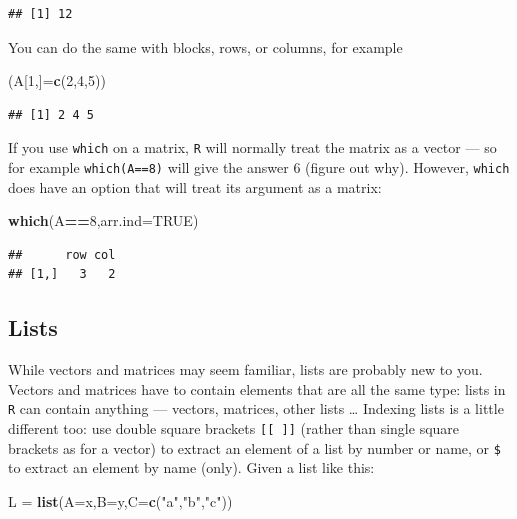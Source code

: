 \documentclass[11pt,]{article}
\newenvironment{Shaded}{\begin{snugshade}}{\end{snugshade}}
\newcommand{\DataTypeTok}[1]{\textcolor[rgb]{0.13,0.29,0.53}{#1}}
\newcommand{\DecValTok}[1]{\textcolor[rgb]{0.00,0.00,0.81}{#1}}
\newcommand{\KeywordTok}[1]{\textcolor[rgb]{0.13,0.29,0.53}{\textbf{#1}}}
\newcommand{\NormalTok}[1]{#1}
\newcommand{\OperatorTok}[1]{\textcolor[rgb]{0.81,0.36,0.00}{\textbf{#1}}}
\newcommand{\OtherTok}[1]{\textcolor[rgb]{0.56,0.35,0.01}{#1}}
\newcommand{\StringTok}[1]{\textcolor[rgb]{0.31,0.60,0.02}{#1}}
\begin{document}
\begin{verbatim}
## [1] 12
\end{verbatim}

You can do the same with blocks, rows, or columns, for example

\begin{Shaded}
\begin{Highlighting}[]
\NormalTok{(A[}\DecValTok{1}\NormalTok{,]=}\KeywordTok{c}\NormalTok{(}\DecValTok{2}\NormalTok{,}\DecValTok{4}\NormalTok{,}\DecValTok{5}\NormalTok{))}
\end{Highlighting}
\end{Shaded}

\begin{verbatim}
## [1] 2 4 5
\end{verbatim}

If you use \texttt{which} on a matrix, \texttt{R} will normally treat the matrix as a vector --- so for example \texttt{which(A==8)} will give the answer 6 (figure out why). However, \texttt{which} does have an option that will treat its argument
as a matrix:

\begin{Shaded}
\begin{Highlighting}[]
\KeywordTok{which}\NormalTok{(A}\OperatorTok{==}\DecValTok{8}\NormalTok{,}\DataTypeTok{arr.ind=}\OtherTok{TRUE}\NormalTok{)}
\end{Highlighting}
\end{Shaded}

\begin{verbatim}
##      row col
## [1,]   3   2
\end{verbatim}

\hypertarget{lists}{%
\subsection{Lists}\label{lists}}

While vectors and matrices may seem familiar, lists are probably new to you. Vectors and matrices have to contain elements that are all the same type: lists in \texttt{R} can contain anything --- vectors, matrices,
other lists \ldots{} Indexing lists is a little different too: use double square brackets \texttt{{[}{[}\ {]}{]}} (rather
than single square brackets as for a vector) to extract an element of a list by number or name, or \texttt{\$} to extract an element by name (only). Given a list like this:

\begin{Shaded}
\begin{Highlighting}[]
\NormalTok{L =}\StringTok{ }\KeywordTok{list}\NormalTok{(}\DataTypeTok{A=}\NormalTok{x,}\DataTypeTok{B=}\NormalTok{y,}\DataTypeTok{C=}\KeywordTok{c}\NormalTok{(}\StringTok{"a"}\NormalTok{,}\StringTok{"b"}\NormalTok{,}\StringTok{"c"}\NormalTok{))}
\end{Highlighting}
\end{Shaded}
\end{document}
